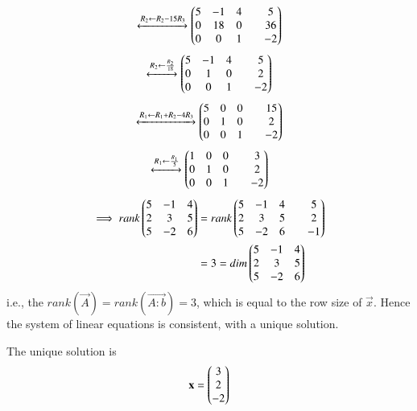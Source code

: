 \documentclass[journal,12pt,twocolumn]{IEEEtran}
\begin{document}
\begin{align}
	\xleftrightarrow[]{R_2 \leftarrow R_2-15 R_3}
	\begin{pmatrix}5 & -1 &  4 & & 5 \\ 0 & 18 & 0 & & 36 \\ 0 & 0 & 1 & & -2\end{pmatrix}
\end{align}
\begin{align}
	\xleftrightarrow[]{R_2 \leftarrow \frac{R_2}{18}}
	\begin{pmatrix}5 & -1 &  4 & & 5 \\ 0 & 1 & 0 & & 2 \\ 0 & 0 & 1 & & -2\end{pmatrix}
\end{align}
\begin{align}
	\xleftrightarrow[]{R_1 \leftarrow R_1+R_2-4 R_3}
	\begin{pmatrix}5 & 0 &  0 & & 15 \\ 0 & 1 & 0 & & 2 \\ 0 & 0 & 1 & & -2\end{pmatrix}
\end{align}
\begin{align}
	\xleftrightarrow[]{R_1 \leftarrow \frac{R_1}{5}}
	\begin{pmatrix}1 & 0 &  0 & & 3 \\ 0 & 1 & 0 & & 2 \\ 0 & 0 & 1 & & -2\end{pmatrix}
\end{align}
\begin{align}
	\implies rank \begin{pmatrix} 5 & -1 & 4 \\ 2 &  3 & 5 \\ 5 & -2 & 6 \end{pmatrix}
	&=
	rank \begin{pmatrix} 5 & -1 & 4 & & 5 \\ 2 & 3 & 5 & & 2 \\ 5 & -2 & 6 & & -1\end{pmatrix}
		\nonumber \\
	&= 3 = dim \begin{pmatrix} 5 & -1 & 4 \\ 2 &  3 & 5 \\ 5 & -2 & 6 \end{pmatrix}
\end{align}
i.e., the $rank(\vec{A}) = rank(\vec{A:b}) = 3$, which is equal to the row size of $\vec{x}$. Hence the system of linear equations is consistent, with a unique solution. 

The unique solution is 
\begin{align}
	\mathbf{x} = \begin{pmatrix}3\\2\\-2\end{pmatrix}
\end{align}
\end{document}
